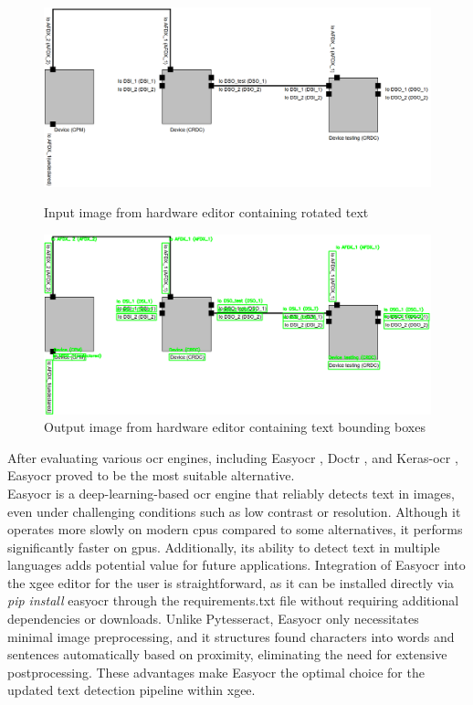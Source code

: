 \begin{figure}[htb]
    \centering
    \includegraphics[width=0.8\linewidth]{pictures/text_before.png}
    \caption[Text detection of rotated text before]{Input image from hardware editor containing rotated text}
    \label{fig:text_before}

    \centering
    \includegraphics[width=0.8\linewidth]{pictures/text_after.png}
    \caption[Text detection of rotated text after]{Output image from hardware editor containing text bounding boxes}
    \label{fig:text_after}
\end{figure}
After evaluating various \acrshort{ocr} engines, including Easy\acrshort{ocr} \cite{easyocr_2024}, Doctr \cite{doctr_2024}, and Keras-\acrshort{ocr} \cite{keras_ocr_2023}, Easy\acrshort{ocr} proved to be the most suitable alternative.\\
Easy\acrshort{ocr} is a deep-learning-based \acrshort{ocr} engine that reliably detects text in images, even under challenging conditions such as low contrast or resolution. Although it operates more slowly on modern \acrshort{cpu}s compared to some alternatives, it performs significantly faster on \acrshort{gpu}s. Additionally, its ability to detect text in multiple languages adds potential value for future applications. Integration of Easy\acrshort{ocr} into the \acrshort{xgee} editor for the user is straightforward, as it can be installed directly via \textit{pip install} easy\acrshort{ocr} through the requirements.txt file without requiring additional dependencies or downloads. Unlike Pytesseract, Easy\acrshort{ocr} only necessitates minimal image preprocessing, and it structures found characters into words and sentences automatically based on proximity, eliminating the need for extensive postprocessing. These advantages make Easy\acrshort{ocr} the optimal choice for the updated text detection pipeline within \acrshort{xgee}.

